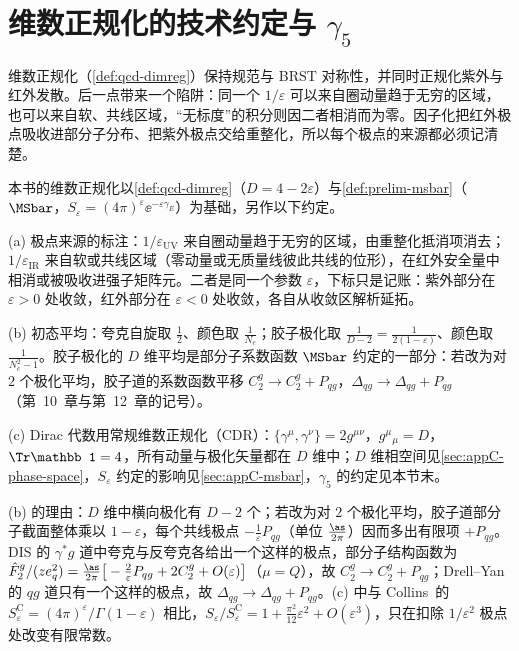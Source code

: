 \section{维数正规化的技术约定与 $\gamma_5$}\label{sec:prelim-dimreg}

维数正规化（\cref{def:qcd-dimreg}）保持规范与 BRST 对称性，并同时正规化紫外与红外发散。后一点带来一个陷阱：同一个 $1/\varepsilon$ 可以来自圈动量趋于无穷的区域，也可以来自软、共线区域，“无标度”的积分则因二者相消而为零。因子化把红外极点吸收进部分子分布、把紫外极点交给重整化，所以每个极点的来源都必须记清楚。

\begin{definition}[维数正规化的技术约定]\label{def:prelim-dr-conventions}
本书的维数正规化以\cref{def:qcd-dimreg}（$D=4-2\varepsilon$）与\cref{def:prelim-msbar}（$\MSbar$，$S_\varepsilon=(4\pi)^\varepsilon\ee^{-\varepsilon\gamma_E}$）为基础，另作以下约定。
\par
(a) 极点来源的标注：$1/\varepsilon_{\mathrm{UV}}$ 来自圈动量趋于无穷的区域，由重整化抵消项消去；$1/\varepsilon_{\mathrm{IR}}$ 来自软或共线区域（零动量或无质量线彼此共线的位形），在红外安全量中相消或被吸收进强子矩阵元。二者是同一个参数 $\varepsilon$，下标只是记账：紫外部分在 $\varepsilon>0$ 处收敛，红外部分在 $\varepsilon<0$ 处收敛，各自从收敛区解析延拓。
\par
(b) 初态平均：夸克自旋取 $\frac12$、颜色取 $\frac1{N_c}$；胶子极化取 $\frac1{D-2}=\frac1{2(1-\varepsilon)}$、颜色取 $\frac1{N_c^2-1}$。胶子极化的 $D$ 维平均是部分子系数函数 $\MSbar$ 约定的一部分：若改为对 $2$ 个极化平均，胶子道的系数函数平移 $C_2^g\to C_2^g+P_{qg}$，$\Delta_{qg}\to\Delta_{qg}+P_{qg}$（第~10~章与第~12~章的记号）。%
\par
(c) Dirac 代数用常规维数正规化（CDR）：$\{\gamma^\mu,\gamma^\nu\}=2g^{\mu\nu}$，$g^\mu{}_\mu=D$，$\Tr\mathbb 1=4$，所有动量与极化矢量都在 $D$ 维中；$D$ 维相空间见\cref{sec:appC-phase-space}，$S_\varepsilon$ 约定的影响见\cref{sec:appC-msbar}，$\gamma_5$ 的约定见本节末。
\end{definition}

(b) 的理由：$D$ 维中横向极化有 $D-2$ 个；若改为对 $2$ 个极化平均，胶子道部分子截面整体乘以 $1-\varepsilon$，每个共线极点 $-\frac1\varepsilon P_{qg}$（单位 $\frac{\as}{2\pi}$）因而多出有限项 $+P_{qg}$。DIS 的 $\gamma^*g$ 道中夸克与反夸克各给出一个这样的极点，部分子结构函数为 $\hat F_2^g/(ze_q^2)=\frac{\as}{2\pi}\big[-\frac2\varepsilon P_{qg}+2C_2^g+O(\varepsilon)\big]$（$\mu=Q$），故 $C_2^g\to C_2^g+P_{qg}$；Drell--Yan 的 $qg$ 道只有一个这样的极点，故 $\Delta_{qg}\to\Delta_{qg}+P_{qg}$。(c) 中与 Collins~\cite{Collins2011}的 $S_\varepsilon^{\mathrm C}=(4\pi)^\varepsilon/\Gamma(1-\varepsilon)$ 相比，$S_\varepsilon/S^{\mathrm C}_\varepsilon=1+\frac{\pi^2}{12}\varepsilon^2+O(\varepsilon^3)$，只在扣除 $1/\varepsilon^2$ 极点处改变有限常数。%

